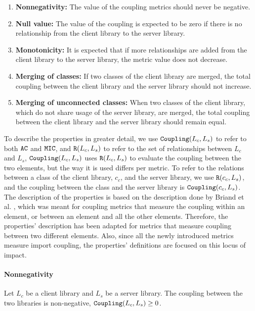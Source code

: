 \begin{enumerate}
  \item \textbf{Nonnegativity:} The value of the coupling metrics should never be negative.
  \item \textbf{Null value:} The value of the coupling is expected to be zero if there is no relationship from the client library to the server library.
  \item \textbf{Monotonicity:} It is expected that if more relationships are added from the client library to the server library, the metric value does not decrease.
  \item \textbf{Merging of classes:} If two classes of the client library are merged, the total coupling between the client library and the server library should not increase.
  \item \textbf{Merging of unconnected classes:} When two classes of the client library, which do not share usage of the server library, are merged, the total coupling between the client library and the server library should remain equal.
\end{enumerate}

To describe the properties in greater detail, we use $\verb|Coupling|(L_c, L_s)$ to refer to both $\verb|AC|$ and $\verb|MIC|$, and $\verb|R|(L_c, L_s)$ to refer to the set of relationships between $L_c$ and $L_s$, $\verb|Coupling|(L_c, L_s)$ uses $\verb|R|(L_c, L_s)$ to evaluate the coupling between the two elements, but the way it is used differs per metric. To refer to the relations between a class of the client library, $c_c$, and the server library, we use $\verb|R|(c_c, L_s)$, and the coupling between the class and the server library is $\verb|Coupling|(c_c, L_s)$. The description of the properties is based on the description done by Briand et al. \cite{briand1996property}, which was meant for coupling metrics that measure the coupling within an element, or between an element and all the other elements. Therefore, the properties' description has been adapted for metrics that measure coupling between two different elements. Also, since all the newly introduced metrics measure import coupling, the properties' definitions are focused on this locus of impact.

\paragraph{Nonnegativity}

Let $L_c$ be a client library and $L_s$ be a server library. The coupling between the two libraries is non-negative, $\verb|Coupling|(L_c, L_s) \ge 0$.

